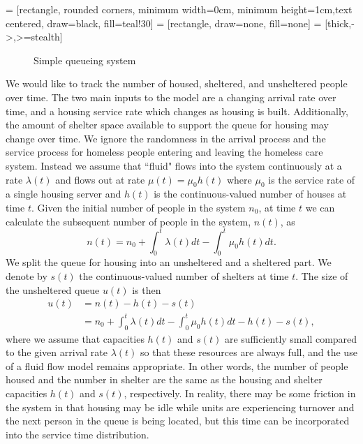 \documentclass[12pt,a4paper]{article}
\begin{document}
 = [rectangle, rounded corners, minimum width=0cm, minimum height=1cm,text centered, draw=black, fill=teal!30]
 = [rectangle, draw=none, fill=none]
 = [thick,->,>=stealth]
%
\begin{figure} 
  \begin{center}
    \caption{Simple queueing system} \label{fig:simple-q}
  \end{center}
\end{figure}
%
We would like to track the number of housed, sheltered, and unsheltered people over time. The two main inputs to the model are a changing arrival rate over time, and a housing service rate which changes as housing is built.  Additionally, the amount of shelter space available to support the queue for housing may change over time. We ignore the randomness in the arrival process and the service process for homeless people entering and leaving the homeless care system. Instead we assume that ``fluid" flows into the system continuously at a rate $\lambda(t)$ and flows out at  rate $\mu(t) = \mu_{0}h(t)$ where $\mu_{0}$ is the service rate of a single housing server and $h(t)$ is the continuous-valued number of houses at time $t$. Given the initial number of people in the system $n_0$, at time $t$ we can calculate the subsequent number of people in the system, $n(t)$, as
%
\begin{equation*} \label{x_t}
n(t) = n_0 + \int_{0}^{t} \lambda(t) dt - \int_{0}^{t} \mu_0 h(t) dt.
\end{equation*}
%
We split the queue for housing into an unsheltered and a sheltered part. We denote by $s(t)$ the continuous-valued number of shelters at time $t$. The size of the unsheltered queue $u(t)$ is then 
%
\begin{align} 
u(t) & = n(t) - h(t) - s(t) \\
& = n_0 + \int_{0}^{t} \lambda(t) dt - \int_{0}^{t} \mu_0 h(t) dt - h(t) - s(t),
\label{u_t}
\end{align}
%
where we assume that capacities $h(t)$ and $s(t)$ are sufficiently small compared to the given arrival rate $\lambda(t)$ so that these resources are always full, and the use of a fluid flow model remains appropriate. In other words, the number of people housed and the number in shelter are the same as the housing and shelter capacities $h(t)$ and $s(t)$, respectively. In reality, there may be some friction in the system in that housing may be idle while units are experiencing turnover and the next person in the queue is being located, but this time can be incorporated into the service time distribution.
\end{document}
